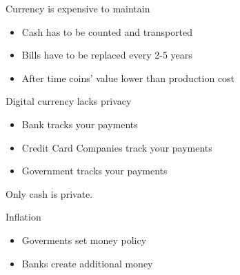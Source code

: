 \documentclass[12pt, usepdftitle=false]{beamer}
\begin{document}

\begin{frame}{Currency is expensive to maintain}
	\begin{itemize}
		\item Cash has to be counted and transported
		\item Bills have to be replaced every 2-5 years
		\item After time coins' value lower than production cost
	\end{itemize}
\end{frame}


\begin{frame}{Digital currency lacks privacy}

	\begin{itemize}
		\item Bank tracks your payments
		\item Credit Card Companies track your payments
		\item Government tracks your payments
	\end{itemize}

	Only cash is private.
\end{frame}


\begin{frame}{Inflation}
	\begin{itemize}
		\item Goverments set money policy
		\item Banks create additional money
	\end{itemize}
\end{frame}

\end{document}
